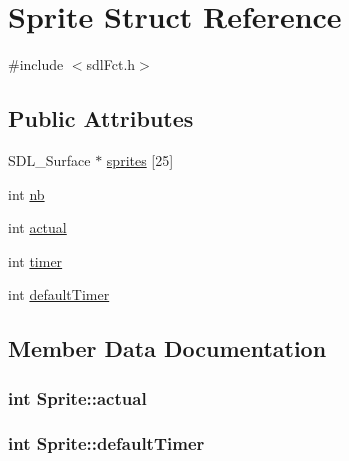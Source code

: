 \hypertarget{struct_sprite}{}\section{Sprite Struct Reference}
\label{struct_sprite}


{\ttfamily \#include $<$sdl\+Fct.\+h$>$}

\subsection*{Public Attributes}
\begin{DoxyCompactItemize}
\item 
S\+D\+L\+\_\+\+Surface $\ast$ \hyperlink{struct_sprite_ad8469d5efb3c49f4503cdd2e1e0cf84e}{sprites} \mbox{[}25\mbox{]}
\item 
int \hyperlink{struct_sprite_af161aa99ddad84227993c7e115c42f8a}{nb}
\item 
int \hyperlink{struct_sprite_aaa3a09f1b82e5fad937e3df6dafd3719}{actual}
\item 
int \hyperlink{struct_sprite_a34eca7b18a9dcbad3a2e9c3bfa40f3c8}{timer}
\item 
int \hyperlink{struct_sprite_a7ab2c9d62f28c94906cdee3ef441cc29}{default\+Timer}
\end{DoxyCompactItemize}


\subsection{Member Data Documentation}
\hypertarget{struct_sprite_aaa3a09f1b82e5fad937e3df6dafd3719}{}
\subsubsection[{actual}]{\setlength{\rightskip}{0pt plus 5cm}int Sprite\+::actual}\label{struct_sprite_aaa3a09f1b82e5fad937e3df6dafd3719}
\hypertarget{struct_sprite_a7ab2c9d62f28c94906cdee3ef441cc29}{}
\subsubsection[{default\+Timer}]{\setlength{\rightskip}{0pt plus 5cm}int Sprite\+::default\+Timer}\label{struct_sprite_a7ab2c9d62f28c94906cdee3ef441cc29}
\hypertarget{struct_sprite_af161aa99ddad84227993c7e115c42f8a}{}
